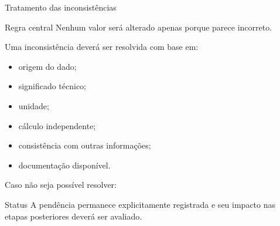 \begin{frame}{Tratamento das inconsistências}

    \begin{alertblock}{Regra central}
        Nenhum valor será alterado apenas porque parece incorreto.
    \end{alertblock}

    \vspace{0.3cm}

    Uma inconsistência deverá ser resolvida com base em:

    \begin{itemize}
        \item origem do dado;
        \item significado técnico;
        \item unidade;
        \item cálculo independente;
        \item consistência com outras informações;
        \item documentação disponível.
    \end{itemize}

    \vspace{0.3cm}

    Caso não seja possível resolver:

    \begin{block}{Status}
        A pendência permanece explicitamente registrada e seu impacto nas
        etapas posteriores deverá ser avaliado.
    \end{block}

\end{frame}



